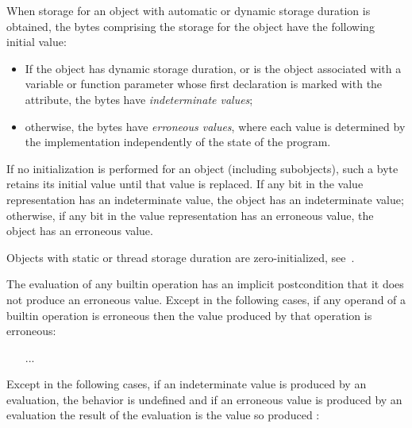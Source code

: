 \begin{adjustwidth}{0.5cm}{0.5cm}
When storage for an object with automatic or dynamic storage duration
is obtained,
the bytes comprising the storage for the object
have the following initial value:
\begin{itemize}
\item
If the object has dynamic storage duration, or
is the object associated with a variable or function parameter
whose first declaration is marked with
the \tcode{[[indeterminate]]} attribute,
the bytes have \emph{indeterminate values};
\item
otherwise, the bytes have \emph{erroneous values},
where each value is determined by the implementation
independently of the state of the program.
\end{itemize}
If no initialization is performed for an object (including subobjects),
such a byte retains its initial value
until that value is replaced.
If any bit in the value representation has an indeterminate value,
the object has an indeterminate value;
otherwise, if any bit in the value representation has an erroneous value,
the object has an erroneous value.
\begin{note}
Objects with static or thread storage duration are zero-initialized,
see~.
\end{note}


\begin{addedblock}
The evaluation of any builtin operation has an implicit postcondition that it
does not produce an erroneous value.  Except in the following cases,
if any operand of a builtin operation is erroneous then the value
produced by that operation is erroneous:
\begin{itemize}
\item [...]
\end{itemize}
\end{addedblock}

Except in the following cases,
if an indeterminate value is produced by an evaluation,
the behavior is undefined
 and if an erroneous value is produced by an evaluation
the result of the evaluation is the value so produced 
:


\end{adjustwidth}

